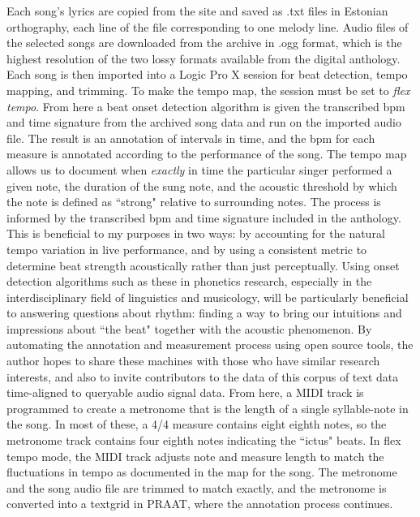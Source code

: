  Each song's lyrics are copied from the site and saved as .txt files in Estonian orthography, each line of the file corresponding to one melody line.  
Audio files of the selected songs are downloaded from the archive in .ogg format, which is the highest resolution of the two lossy formats available from the digital anthology. Each song is then imported into a Logic Pro X \citep{logic2014} session for beat detection, tempo mapping, and trimming. 
To make the tempo map, the session must be set to {\it flex tempo}. From here a beat onset detection algorithm is  given the transcribed bpm and time signature from the archived song data and run on the imported audio file. The result is an annotation of intervals in time, and the bpm for each measure is annotated according to the performance of the song.
The tempo map allows us to document when {\it exactly} in time the particular singer performed a given note, the duration of the sung note, and the acoustic threshold by which the note is defined as ``strong" relative to surrounding notes. The process is informed by the transcribed bpm and time signature included in the anthology. This is beneficial to my purposes in two ways: by accounting for the natural tempo variation in live performance, and by using a consistent metric to determine beat strength acoustically rather than just perceptually. Using onset detection algorithms such as these \citep{bKeeper2007} in phonetics research, especially in the interdisciplinary field of linguistics and musicology, will be particularly beneficial to answering questions about rhythm: finding a way to bring our intuitions and impressions about ``the beat" together with the acoustic phenomenon. By automating the annotation and measurement process using open source tools, the author hopes to share these machines with those who have similar research interests, and also to invite contributors to the data of this corpus of text data time-aligned to queryable audio signal data. From here, a MIDI track is programmed to create a metronome that is the length of a single syllable-note in the song. In most of these, a 4/4 measure contains eight eighth notes, so the metronome track contains four eighth notes indicating the ``ictus" beats. In flex tempo mode, the MIDI track adjusts note and measure length to match the fluctuations in tempo as documented in the map for the song. The metronome and the song audio file are trimmed to match exactly, and the metronome is converted into a textgrid in PRAAT\citep{boersna2022}, where the annotation process continues. 

